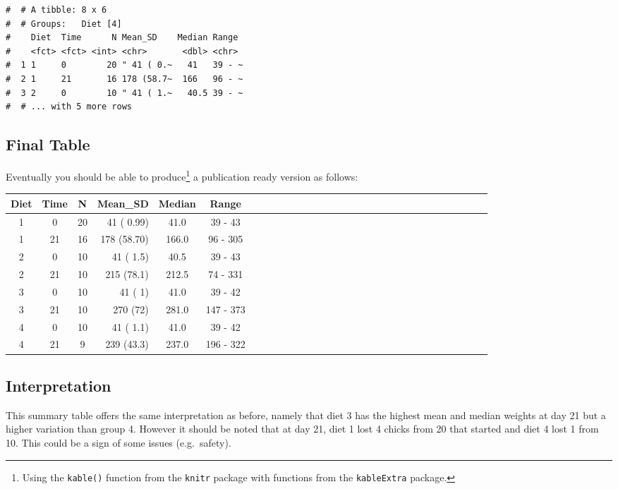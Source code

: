 \documentclass[a4paper,9pt,twocolumn,twoside,printwatermark=false]{pinp}
\begin{document}
\begin{ShadedResult}
\begin{verbatim}
#  # A tibble: 8 x 6
#  # Groups:   Diet [4]
#    Diet  Time      N Mean_SD    Median Range 
#    <fct> <fct> <int> <chr>       <dbl> <chr> 
#  1 1     0        20 " 41 ( 0.~   41   39 - ~
#  2 1     21       16 178 (58.7~  166   96 - ~
#  3 2     0        10 " 41 ( 1.~   40.5 39 - ~
#  # ... with 5 more rows
\end{verbatim}
\end{ShadedResult}

\subsection{Final Table}\label{final-table}

Eventually you should be able to produce\footnote{Using the
  \texttt{kable()} function from the \texttt{knitr} package with
  functions from the \texttt{kableExtra} package.} a publication ready
version as follows:

\begin{table}[H]
\centering
\begin{tabular}{cccrccccrccccrccccrccccrccccrc}
\toprule
\textbf{Diet} & \textbf{Time} & \textbf{N} & \textbf{Mean\_SD} & \textbf{Median} & \textbf{Range}\\
\midrule
1 & 0 & 20 & 41 ( 0.99) & 41.0 & 39 - 43\\
\rowcolor{lightgray}  1 & 21 & 16 & 178 (58.70) & 166.0 & 96 - 305\\
2 & 0 & 10 & 41 ( 1.5) & 40.5 & 39 - 43\\
\rowcolor{lightgray}  2 & 21 & 10 & 215 (78.1) & 212.5 & 74 - 331\\
3 & 0 & 10 & 41 ( 1) & 41.0 & 39 - 42\\
\rowcolor{lightgray}  3 & 21 & 10 & 270 (72) & 281.0 & 147 - 373\\
4 & 0 & 10 & 41 ( 1.1) & 41.0 & 39 - 42\\
\rowcolor{lightgray}  4 & 21 & 9 & 239 (43.3) & 237.0 & 196 - 322\\
\bottomrule
\end{tabular}
\end{table}

\subsection{Interpretation}\label{interpretation-5}

This summary table offers the same interpretation as before, namely that
diet 3 has the highest mean and median weights at day 21 but a higher
variation than group 4. However it should be noted that at day 21, diet
1 lost 4 chicks from 20 that started and diet 4 lost 1 from 10. This
could be a sign of some issues (e.g.~safety).
\end{document}
